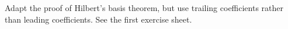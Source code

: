 Adapt the proof of Hilbert's basis theorem, but use trailing coefficients rather
than leading coefficients. See the first exercise sheet.
